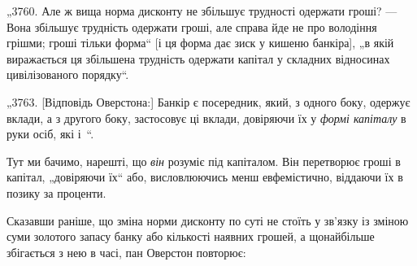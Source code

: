 „3760. Але ж вища норма дисконту не збільшує трудності
одержати гроші? — Вона збільшує трудність одержати гроші, але
справа йде не про володіння грішми; гроші тільки форма“ [і ця
форма дає зиск у кишеню банкіра], „в якій виражається ця збільшена трудність одержати капітал у
складних відносинах цивілізованого порядку“.

„3763. [Відповідь Оверстона:] Банкір є посередник, який,
з одного боку, одержує вклади, а з другого боку, застосовує
ці вклади, довіряючи їх у \emph{формі капіталу} в руки осіб, які
і~“.

Тут ми бачимо, нарешті, що \emph{він} розуміє під капіталом. Він
перетворює гроші в капітал, „довіряючи їх“ або, висловлюючись
менш евфемістично, віддаючи їх в позику за проценти.

Сказавши раніше, що зміна норми дисконту по суті не стоїть
у зв’язку із зміною суми золотого запасу банку або кількості
наявних грошей, а щонайбільше збігається з нею в часі, пан
Оверстон повторює:
